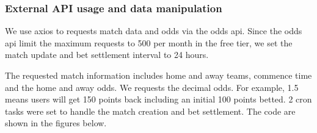 \documentclass[singlecolumn]{article}
\begin{document}
\subsubsection{External API usage and data manipulation}

We use axios to requests match data and odds via the odds api. Since the odds api limit the maximum requests to 500 per month in the free tier, we set the match update and bet settlement interval to 24 hours. 

The requested match information includes home and away teams, commence time and the home and away odds. We requests the decimal odds. For example, 1.5 means users will get 150 points back including an initial 100 points betted. 2 cron tasks were set to handle the match creation and bet settlement. The code are shown in the figures below.
\end{document}
